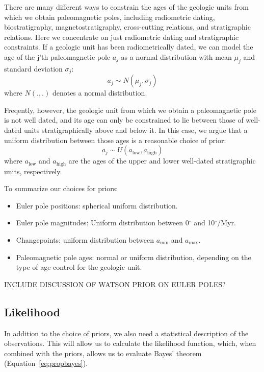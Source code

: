 \documentclass[preprint,12pt,authoryear]{elsarticle}
\begin{document}
There are many different ways to constrain the ages of the geologic units from
which we obtain paleomagnetic poles, including radiometric dating, biostratigraphy,
magnetostratigraphy, cross-cutting relations, and stratigraphic relations.
Here we concentrate on just radiometric dating and stratigraphic constraints.
If a geologic unit has been radiometrically dated, we can model the age of
the j'th paleomagnetic pole $a_j$ as a normal distribution with mean $\mu_j$ and standard deviation $\sigma_j$:
\begin{equation}
a_j \sim N(\mu_j, \sigma_j)
\end{equation}
where $N(.,.)$ denotes a normal distribution.

Freqently, however, the geologic unit from which we obtain a paleomagnetic pole
is not well dated, and its age can only be constrained to lie between those
of well-dated units stratigraphically above and below it. In this case,
we argue that a uniform distribution between those ages is a reasonable choice
of prior:
\begin{equation}
a_j \sim U(a_\mathrm{low}, a_\mathrm{high})
\end{equation}
where $a_\mathrm{low}$ and $a_\mathrm{high}$ are the ages of the upper and lower
well-dated stratigraphic units, respectively.

To summarize our choices for priors:
\begin{itemize}
\item Euler pole positions: spherical uniform distribution.
\item Euler pole magnitudes: Uniform distribution between 0$^\circ$ and 10$^\circ$/Myr.
\item Changepoints: uniform distribution between $a_\mathrm{min}$ and $a_\mathrm{max}$.
\item Paleomagnetic pole ages: normal or uniform distribution, depending on the type of age control for the geologic unit.
\end{itemize}


INCLUDE DISCUSSION OF WATSON PRIOR ON EULER POLES?


\subsection{Likelihood}

In addition to the choice of priors, we also need a statistical description of the observations.
This will allow us to calculate the likelihood function, which, when combined with the priors,
allows us to evaluate Bayes' theorem (Equation~\eqref{eq:propbayes}).
\end{document}
